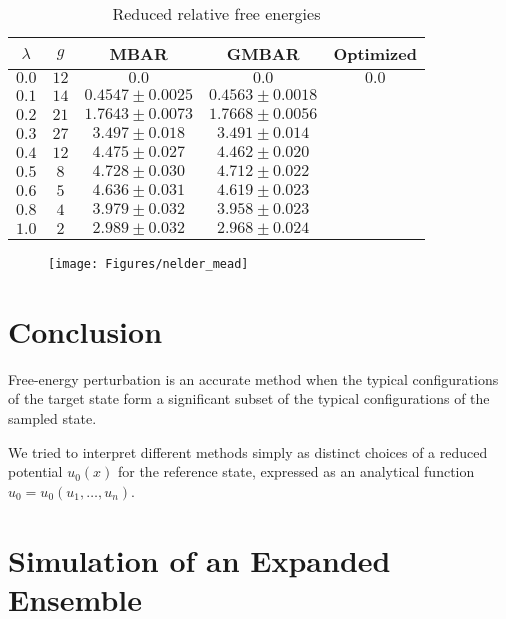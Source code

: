 \documentclass[aip,jcp,reprint,amsmath,amssymb]{revtex4-1}
\begin{document}
\begin{table}
\caption{Reduced relative free energies}
\label{table:propane solvation}
\begin{ruledtabular}
\begin{tabular}{ccccc}
$\lambda$ & $g$ & MBAR & GMBAR & Optimized \\
\hline
$0.0$ & $12$ & $0.0$ & $0.0$ & $0.0$ \\
$0.1$ & $14$ & $0.4547 \pm 0.0025$ & $0.4563 \pm 0.0018$ \\
$0.2$ & $21$ & $1.7643 \pm 0.0073$ & $1.7668 \pm 0.0056$ \\
$0.3$ & $27$ &  $3.497 \pm 0.018$  &  $3.491 \pm 0.014$ \\
$0.4$ & $12$ &  $4.475 \pm 0.027$  &  $4.462 \pm 0.020$ \\
$0.5$ & $8$  &  $4.728 \pm 0.030$  &  $4.712 \pm 0.022$ \\
$0.6$ & $5$  &  $4.636 \pm 0.031$  &  $4.619 \pm 0.023$ \\
$0.8$ & $4$  &  $3.979 \pm 0.032$  &  $3.958 \pm 0.023$ \\
$1.0$ & $2$  &  $2.989 \pm 0.032$  &  $2.968 \pm 0.024$
\end{tabular}
\end{ruledtabular}
\end{table}

\begin{figure}
\centering
\texttt{[image: Figures/nelder\_mead]}
\caption{}
\label{fig:nelder_mead}
\end{figure}


\section{Conclusion}

Free-energy perturbation is an accurate method when the typical configurations of the target state form a significant subset of the typical configurations of the sampled state.

We tried to interpret different methods simply as distinct choices of a reduced potential $u_0(x)$ for the reference state, expressed as an analytical function $u_0 = u_0(u_1,\dots,u_n)$.

\appendix

\section{Simulation of an Expanded Ensemble}
\label{sec:expanded ensemble simulation}
\end{document}
